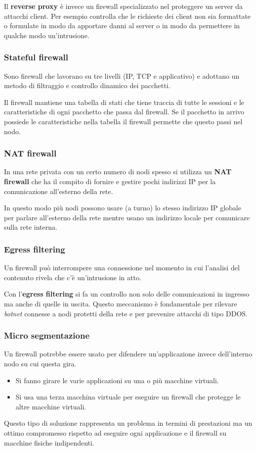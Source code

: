 Il \textbf{reverse proxy} è invece un firewall specializzato nel proteggere un server da attacchi client. Per esempio
controlla che le richieste dei client non sia formattate o formulate in modo da apportare danni al server o in modo da
permettere in qualche modo un'intrusione.

\subsubsection{Stateful firewall}
Sono firewall che lavorano su tre livelli (IP, TCP e applicativo) e adottano un metodo di filtraggio e controllo
dinamico dei pacchetti.

Il firewall mantiene una tabella di stati che tiene traccia di tutte le sessioni e le caratteristiche di ogni pacchetto
che passa dal firewall. Se il pacchetto in arrivo possiede le caratteristiche nella tabella il firewall permette che
questo passi nel nodo.

\subsubsection{NAT firewall}
In una rete privata con un certo numero di nodi spesso si utilizza un \textbf{NAT firewall} che ha il compito di
fornire e gestire pochi indirizzi IP per la comunicazione all'esterno della rete.

In questo modo più nodi possono usare (a turno) lo stesso indirizzo IP globale per parlare all'esterno della rete mentre
usano un indirizzo locale per comunicare sulla rete interna.

\subsubsection{Egress filtering}
Un firewall può interrompere una connessione nel momento in cui l'analisi del contenuto rivela che c'è un'intrusione in
atto.

Con l'\textbf{egress filtering} si fa un controllo non solo delle comunicazioni in ingresso ma anche di quelle in
uscita. Questo meccanismo è fondamentale per rilevare \emph{botnet} connesse a nodi protetti della rete e per prevenire
attacchi di tipo DDOS.

\subsubsection{Micro segmentazione}
Un firewall potrebbe essere usato per difendere un'applicazione invece dell'interno nodo su cui questa gira.
\begin{itemize}
	\item Si fanno girare le varie applicazioni su una o più macchine virtuali.
	\item Si usa una terza macchina virtuale per eseguire un firewall che protegge le altre macchine virtuali.
\end{itemize}
Questo tipo di soluzione rappresenta un problema in termini di prestazioni ma un ottimo compromesso rispetto ad
eseguire ogni applicazione e il firewall su macchine fisiche indipendenti.

